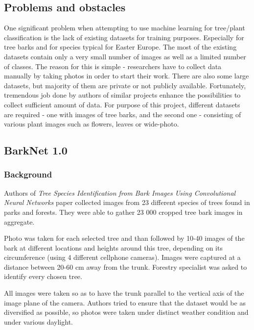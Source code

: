 \documentclass[../Main.tex]{subfiles}
\begin{document}
\subsection{Problems and obstacles}
One significant problem when attempting to use machine learning for tree/plant classification is the lack of existing datasets for training purposes. Especially for tree barks and for species typical for Easter Europe. The most of the existing datasets contain only a very small number of images as well as a limited number of classes. The reason for this is simple - researchers have to collect data manually by taking photos in order to start their work. 
There are also some large datasets, but majority of them are private or not publicly available. Fortunately, tremendous job done by authors of similar projects \cite{treebark2018} \cite{Robert2020BarkRe-Id} \cite{leafsnap_eccv2012} \cite{plantnet-db} \cite{leafsnap-db} enhance the possibilities to collect sufficient amount of data. 
For purpose of this project, different datasets are required - one with images of tree barks, and the second one - consisting of various plant images such as flowers, leaves or wide-photo.

\subsection{BarkNet 1.0}
    \subsubsection{Background}
    Authors of \textit{Tree Species Identification from Bark Images Using Convolutional Neural Networks} paper \cite{treebark2018} collected images from 23 different species of trees found in parks and forests. They were able to gather 23 000 cropped tree bark images in aggregate. 
    
    Photo was taken for each selected tree and than followed by 10-40 images of the bark at different locations and heights around this tree, depending on its circumference (using 4 different cellphone cameras). Images were captured at a distance between 20-60 cm away from the trunk. Forestry specialist was asked to identify every chosen tree.

    All images were taken so as to have the trunk parallel to the vertical axis of the image plane of the camera.
    Authors tried to ensure that the dataset would be as diversified as possible, so photos were taken under distinct weather condition and under various daylight.
\end{document}
